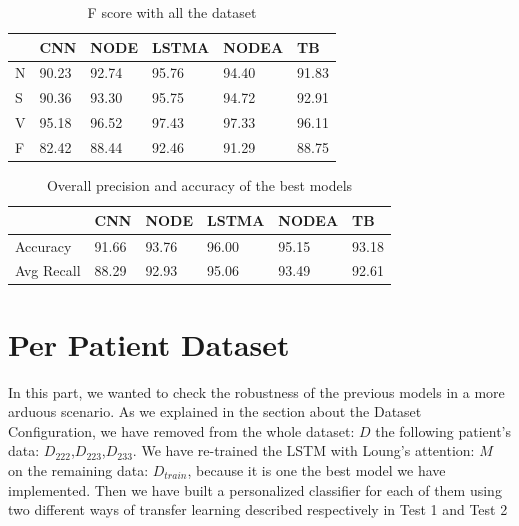 \documentclass[LaM,binding=0.6cm]{sapthesis}
\begin{document}
\begin{table}[H]
\centering
\begin{tabular}{l|l|l|l|l|l|}
\cline{2-6}

                        & CNN   & NODE & LSTMA & NODEA & TB\\ \hline
\multicolumn{1}{|l|}{N} & 90.23 & 92.74      & 95.76               & 94.40                      & 91.83            \\ \hline
\multicolumn{1}{|l|}{S} & 90.36 & 93.30      & 95.75               & 94.72                      & 92.91            \\ \hline
\multicolumn{1}{|l|}{V} & 95.18 & 96.52      & 97.43               & 97.33                      & 96.11            \\ \hline
\multicolumn{1}{|l|}{F} & 82.42 & 88.44      & 92.46               & 91.29                      & 88.75            \\ \hline
\end{tabular}
\caption{F score with all the dataset}
\label{tab:t3}
\end{table}


\begin{table}[H]
\centering
\begin{tabular}{l|l|l|l|l|l|}
\cline{2-6}

                        & CNN   & NODE & LSTMA & NODEA & TB\\ \hline
\multicolumn{1}{|l|}{Accuracy} & 91.66 & 93.76      & 96.00               & 95.15                     & 93.18            \\ \hline
\multicolumn{1}{|l|}{Avg Recall} & 88.29 & 92.93      & 95.06               & 93.49                      & 92.61            \\ \hline
\end{tabular}
\caption{Overall precision and accuracy of the best models}
\label{tab:t4}
\end{table}

\section{Per Patient Dataset}
In this part, we wanted to check the robustness of the previous models in a more arduous scenario. As we explained in the section about the Dataset Configuration, we have removed from the whole dataset: $D$ the following patient's data: $D_{222}$,$D_{223}$,$D_{233}$. We have re-trained the LSTM with Loung's attention: $M$ on the remaining data: $D_{train}$, because it is one the best model we have implemented. Then we have built a personalized classifier for each of them using two different ways of transfer learning described respectively in Test 1 and Test 2
\end{document}
